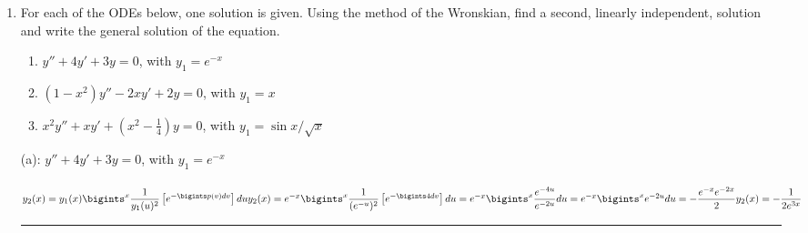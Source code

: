 \documentclass[fleqn]{article}
\begin{document}
\begin{enumerate}
    \item  For each of the ODEs below, one solution is given. Using the method of the Wronskian, find a second, linearly independent, solution and write the general solution of the equation. 
      \begin{enumerate}
      \item $y'' + 4 y' + 3 y =0 $, with $y_1= e^{-x}$

      \item $(1-x^2) y'' - 2 x y' + 2y=0 $, with $y_1= x$

      \item $x^2 y'' + x y' + (x^2 - \frac{1}{4})y=0 $, with $y_1=\sin x/\sqrt{x}$
      \end{enumerate}

      \textcolor{hwColor}{
        (a): $y'' + 4 y' + 3 y =0 $, with $y_1=e^{-x}$ \\
        \\
        $
          y_2(x)=y_1(x) \bigints_{}^{x} \dfrac{1}{y_1(u)^2}\left[e^{-\bigints p(v)dv}\right]du \\
          \\
          y_2(x)=e^{-x} \bigints_{}^{x} \dfrac{1}{(e^{-u})^2}\left[e^{-\bigints 4dv}\right]du=e^{-x} \bigints_{}^{x} \dfrac{e^{-4u}}{e^{-2u}}du=e^{-x} \bigints_{}^{x} e^{-2u}du=-\dfrac{e^{-x} e^{-2x}}{2} \\
          \\
          y_2(x)=-\dfrac{1}{2e^{3x}}
        $
      }

      \textcolor{hwColor}{
        \rule{15cm}{1pt}
      }


\end{enumerate}
\end{document}
